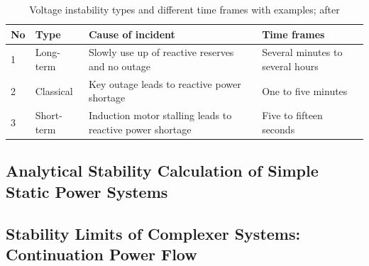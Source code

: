         
\begin{table}
    \centering
    \caption[Voltage instability types and different time frames]{Voltage instability types and different time frames with examples; after \quelle}
    \small
    \renewcommand\tabularxcolumn[1]{m{#1}}
    \vspace*{12pt}
    \begin{tabularx}{\textwidth}{llXX}
        \toprule
        \textbf{No} & \textbf{Type} & \textbf{Cause of incident} & \textbf{Time frames} \\
        \toprule
        1 & Long-term & Slowly use up of reactive reserves and no outage & Several minutes to several hours \\
        2 & Classical & Key outage leads to reactive power shortage & One to five minutes \\
        3 & Short-term & Induction motor stalling leads to reactive power shortage & Five to fifteen seconds \\
        \bottomrule
    \end{tabularx}
\end{table}

        
\subsection{Analytical Stability Calculation of Simple Static Power Systems}
\label{sec:analytical-voltage-stability}

\subsection{Stability Limits of Complexer Systems: Continuation Power Flow}
\label{sec:continuation-power-flow}

